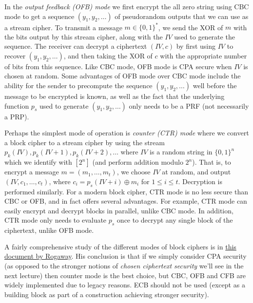 In the \emph{output feedback (OFB) mode} we first encrypt the all zero
string using CBC mode to get a sequence \((y_1,y_2,\ldots)\) of
pseudorandom outputs that we can use as a stream cipher. To transmit a
message \(m \in \{0,1\}^*\), we send the XOR of \(m\) with the bits
output by this stream cipher, along with the
\(\ensuremath{\mathit{IV}}\) used to generate the sequence. The receiver
can decrypt a ciphertext \((\ensuremath{\mathit{IV}}, c)\) by first
using \(\ensuremath{\mathit{IV}}\) to recover \((y_1, y_2, \ldots)\),
and then taking the XOR of \(c\) with the appropriate number of bits
from this sequence. Like CBC mode, OFB mode is CPA secure when
\(\ensuremath{\mathit{IV}}\) is chosen at random. Some advantages of OFB
mode over CBC mode include the ability for the sender to precompute the
sequence \((y_1, y_2, \ldots)\) well before the message to be encrypted
is known, as well as the fact that the underlying function \(p_s\) used
to generate \((y_1, y_2, \ldots)\) only needs to be a PRF (not
necessarily a PRP).

Perhaps the simplest mode of operation is \emph{counter (CTR) mode}
where we convert a block cipher to a stream cipher by using the stream
\(p_k(\ensuremath{\mathit{IV}}),p_k(\ensuremath{\mathit{IV}}+1),p_k(\ensuremath{\mathit{IV}}+2),\ldots\)
where \(\ensuremath{\mathit{IV}}\) is a random string in \(\{0,1\}^n\)
which we identify with \([2^n]\) (and perform addition modulo \(2^n\)).
That is, to encrypt a message \(m = (m_1, \ldots, m_t)\), we choose
\(\ensuremath{\mathit{IV}}\) at random, and output
\((\ensuremath{\mathit{IV}}, c_1, \ldots, c_t)\), where
\(c_i = p_s(\ensuremath{\mathit{IV}} + i) \oplus m_i\) for
\(1 \le i \le t\). Decryption is performed similarly. For a modern block
cipher, CTR mode is no less secure than CBC or OFB, and in fact offers
several advantages. For example, CTR mode can easily encrypt and decrypt
blocks in parallel, unlike CBC mode. In addition, CTR mode only needs to
evaluate \(p_s\) once to decrypt any single block of the ciphertext,
unlike OFB mode.

A fairly comprehensive study of the different modes of block ciphers is
in \href{http://web.cs.ucdavis.edu/~rogaway/papers/modes.pdf}{this
document by Rogaway}. His conclusion is that if we simply consider CPA
security (as opposed to the stronger notions of \emph{chosen ciphertext
security} we'll see in the next lecture) then counter mode is the best
choice, but CBC, OFB and CFB are widely implemented due to legacy
reasons. ECB should not be used (except as a building block as part of a
construction achieving stronger security).
